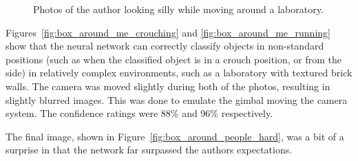 \begin{figure}[h!]
    \centering
	\quad
    \caption{Photos of the author looking silly while moving around a laboratory.}
\end{figure}

Figures~\ref{fig:box_around_me_crouching} and \ref{fig:box_around_me_running} show that the neural network can correctly classify objects in non-standard positions (such as when the classified object is in a crouch position, or from the side) in relatively complex environments, such as a laboratory with textured brick walls. The camera was moved slightly during both of the photos, resulting in slightly blurred images. This was done to emulate the gimbal moving the camera system. The confidence ratings were 88\% and 96\% respectively.

The final image, shown in Figure~\ref{fig:box_around_people_hard}, was a bit of a surprise in that the network far surpassed the authors expectations.


